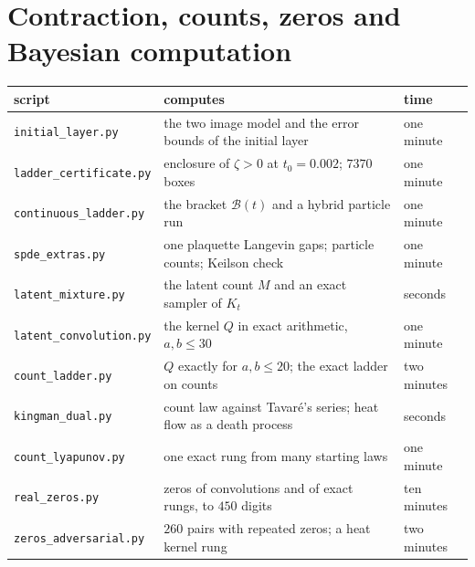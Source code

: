 \section{Contraction, counts, zeros and Bayesian computation}
\begin{center}
\footnotesize
\begin{tabular}{p{1.3in}p{2.05in}p{0.7in}}
\toprule
script & computes & time \\ \midrule
\texttt{initial\_layer.py} & the two image model and the error bounds of the initial layer & one minute \\
{\scriptsize\texttt{ladder\_certificate.py}} & enclosure of $\zeta>0$ at $t_0=0.002$; $7370$ boxes & one minute \\
{\scriptsize\texttt{continuous\_ladder.py}} & the bracket $\mathcal B(t)$ and a hybrid particle run & one minute \\
\texttt{spde\_extras.py} & one plaquette Langevin gaps; particle counts; Keilson check & one minute \\
\texttt{latent\_mixture.py} & the latent count $M$ and an exact sampler of $K_t$ & seconds \\
{\scriptsize\texttt{latent\_convolution.py}} & the kernel $Q$ in exact arithmetic, $a,b\le30$ & one minute \\
\texttt{count\_ladder.py} & $Q$ exactly for $a,b\le20$; the exact ladder on counts & two minutes \\
\texttt{kingman\_dual.py} & count law against Tavar\'e's series; heat flow as a death process & seconds \\
\texttt{count\_lyapunov.py} & one exact rung from many starting laws & one minute \\
\texttt{real\_zeros.py} & zeros of convolutions and of exact rungs, to $450$ digits & ten minutes \\
{\scriptsize\texttt{zeros\_adversarial.py}} & $260$ pairs with repeated zeros; a heat kernel rung & two minutes \\
\bottomrule
\end{tabular}
\end{center}

